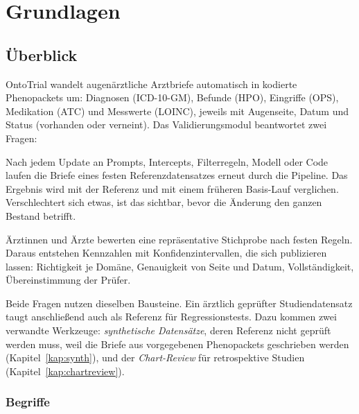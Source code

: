 \documentclass[11pt,a4paper,parskip=half-,headings=standardclasses,toc=bibliography,open=any]{scrreprt}
\begin{document}
\part{Grundlagen}

\chapter{Überblick}

OntoTrial wandelt augenärztliche Arztbriefe automatisch in kodierte Phenopackets um: Diagnosen (ICD-10-GM), Befunde (HPO), Eingriffe (OPS), Medikation (ATC) und Messwerte (LOINC), jeweils mit Augenseite, Datum und Status (vorhanden oder verneint). Das Validierungsmodul beantwortet zwei Fragen:

\begin{description}[style=nextline,leftmargin=1.5em]
  \item[Ist eine Änderung an der Pipeline unbedenklich? (Regressionstest)]
  Nach jedem Update an Prompts, Intercepts, Filterregeln, Modell oder Code laufen die Briefe eines festen Referenzdatensatzes erneut durch die Pipeline. Das Ergebnis wird mit der Referenz und mit einem früheren Basis-Lauf verglichen. Verschlechtert sich etwas, ist das sichtbar, bevor die Änderung den ganzen Bestand betrifft.
  \item[Wie gut ist die Extraktion? (Validierungsstudie)]
  Ärztinnen und Ärzte bewerten eine repräsentative Stichprobe nach festen Regeln. Daraus entstehen Kennzahlen mit Konfidenzintervallen, die sich publizieren lassen: Richtigkeit je Domäne, Genauigkeit von Seite und Datum, Vollständigkeit, Übereinstimmung der Prüfer.
\end{description}

Beide Fragen nutzen dieselben Bausteine. Ein ärztlich geprüfter Studiendatensatz taugt anschließend auch als Referenz für Regressionstests. Dazu kommen zwei verwandte Werkzeuge: \emph{synthetische Datensätze}, deren Referenz nicht geprüft werden muss, weil die Briefe aus vorgegebenen Phenopackets geschrieben werden (Kapitel~\ref{kap:synth}), und der \emph{Chart-Review} für retrospektive Studien (Kapitel~\ref{kap:chartreview}).

\section{Begriffe}
\end{document}
